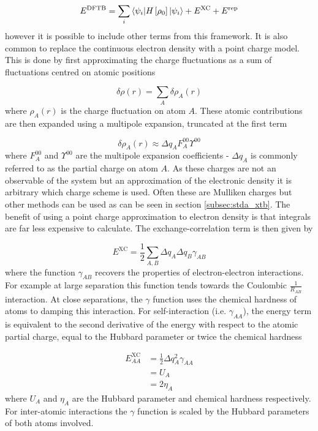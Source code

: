 \begin{equation}
    \label{eq:dftb_energies}
    E^{\text{DFTB}} = \sum_i \braket{\psi_i|H_{} \left[ \rho_0 \right]|\psi_i} + E^\text{XC} + E^\text{rep}
\end{equation}
%
however it is possible to include other terms from this framework. It is also common
to replace the continuous electron density with a point charge model. This is done
by first approximating the charge fluctuations as a sum of fluctuations centred 
on atomic positions

\begin{equation}
    \delta \rho\left(r\right) = \sum_A \delta \rho_A \left(r\right)
\end{equation}
%
where $\rho_A \left(r\right)$ is the charge fluctuation on atom $A$. These atomic
contributions are then expanded using a multipole expansion, truncated at the first
term

\begin{equation}
    \delta \rho_A \left(r\right) \approx \Delta q_A F_A^{00} \Upsilon^{00}
\end{equation}
%
where $F_A^{00}$ and $\Upsilon^{00}$ are the multipole expansion coefficients - 
$\Delta q_A$ is commonly referred to as the partial charge on atom $A$. As these
charges are not an observable of the system but an approximation of the electronic
density it is arbitrary which charge scheme is used. Often these are Mulliken charges 
but other methods can be used as can be seen in section \ref{subsec:stda_xtb}. The
benefit of using a point charge approximation to electron density is that integrals
are far less expensive to calculate. The exchange-correlation term is then given
by

\begin{equation}
    E^{\text{XC}} = \frac{1}{2}\sum_{A,B} \Delta q_A \Delta q_B \gamma_{AB}
\end{equation}
%
where the function $\gamma_{AB}$ recovers the properties of electron-electron interactions.
For example at large separation this function tends towards the Coulombic $\frac{1}{R_{AB}}$
interaction. At close separations, the $\gamma$ function uses the chemical hardness 
of atoms to damping this interaction. For self-interaction (i.e. $\gamma_{AA}$), 
the energy term is equivalent to the second derivative of the energy with respect
to the atomic partial charge, equal to the Hubbard parameter or twice the chemical
hardness 

\begin{equation}
    \begin{split}
    E^{\text{XC}}_{AA} &= \frac{1}{2} \Delta q_A^2 \gamma_{AA} \\
    &= U_{A} \\
    &= 2 \eta_A
    \end{split}
\end{equation}
%
where $U_A$ and $\eta_A$ are the Hubbard parameter and chemical hardness respectively.
For inter-atomic interactions the $\gamma$ function is scaled by the Hubbard parameters
of both atoms involved.

